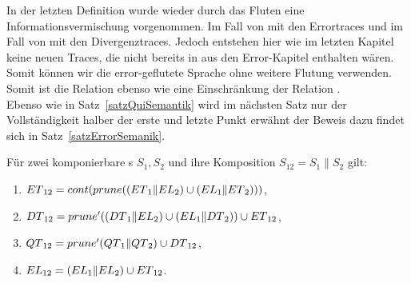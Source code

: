 In der letzten Definition wurde wieder durch das Fluten eine
Informationsvermischung vorgenommen. Im Fall von \DT{} mit den Errortraces und
im Fall von \QT{} mit den Divergenztraces. Jedoch entstehen hier wie im letzten
Kapitel keine neuen Traces, die nicht bereits in \EL{} aus den Error-Kapitel
enthalten wären. Somit können wir die error-geflutete Sprache ohne weitere
Flutung verwenden. Somit ist die Relation \DRel{} ebenso wie \QRel{} eine
Einschränkung der Relation \ERel{}.\\
Ebenso wie in Satz~\ref{satzQuiSemantik} wird im nächsten Satz nur der
Vollständigkeit halber der erste und letzte Punkt erwähnt der Beweis dazu
findet sich in Satz~\ref{satzErrorSemanik}.

\begin{satz}
  Für zwei komponierbare \EIO{}s $S_1, S_2$ und ihre Komposition
  $S_{12}=S_1\|S_2$ gilt:
  \begin{enumerate}
    \item $ET{}_{12}=cont (prune ((ET{}_1\|EL{}_2)\cup
      (EL{}_1\|ET{}_2)))$,
    \item $DT{}_{12}=prune' ((DT{}_1\|EL{}_2)\cup (EL{}_1\|DT{}_2))\cup
      ET{}_{12}$,
    \item $QT{}_{12}=prune' (QT{}_1\|QT{}_2)\cup DT{}_{12}$,
    \item $EL{}_{12}=(EL{}_1\|EL{}_2)\cup ET{}_{12}$.
  \end{enumerate}
\end{satz}

